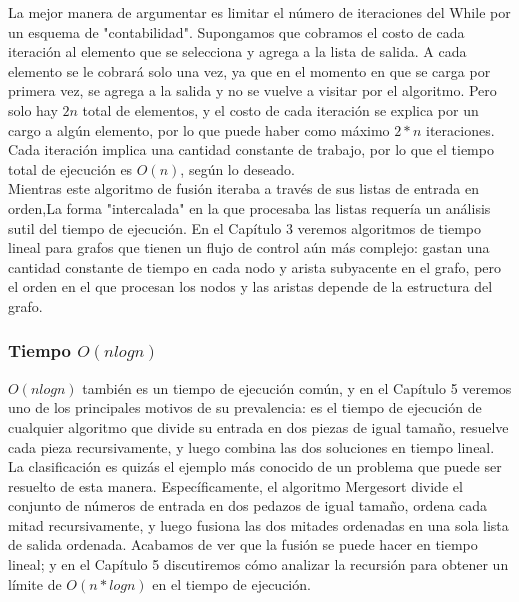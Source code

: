 \documentclass[a4paper, 12pt]{book}
\theoremstyle{dotless}
\begin{document}
La mejor manera de argumentar es limitar el número de iteraciones del While por un esquema de "contabilidad". Supongamos que cobramos el costo de cada iteración al elemento que se selecciona y agrega a la lista de salida. A cada elemento se le cobrará solo una vez, ya que en el momento en que se carga por primera vez, se agrega a la salida y no se vuelve a visitar por el algoritmo. Pero solo hay $2n$ total de elementos, y el costo de cada iteración se explica por un cargo a algún elemento, por lo que puede haber como máximo $2*n$ iteraciones. Cada iteración implica una cantidad constante de trabajo, por lo que el tiempo total de ejecución es $O(n)$, según lo deseado.\\

 Mientras este algoritmo de fusión iteraba a través de sus listas de entrada en orden,La forma "intercalada" en la que procesaba las listas requería un análisis  sutil del tiempo de ejecución. En el Capítulo 3 veremos algoritmos de tiempo lineal para grafos que tienen un flujo de control aún más complejo: gastan una cantidad constante de tiempo en cada nodo y arista subyacente en el grafo, pero el orden en el que procesan los nodos y las aristas depende de la estructura del grafo.\\

\subsubsection*{Tiempo $O(nlogn)$} 

$O(nlog n)$ también es un tiempo de ejecución común, y en el Capítulo 5 veremos uno de los principales motivos de su prevalencia: es el tiempo de ejecución de cualquier algoritmo que divide su entrada en dos piezas de igual tamaño, resuelve cada pieza recursivamente, y luego combina las dos soluciones en tiempo lineal.\\

La clasificación es quizás el ejemplo más conocido de un problema que puede ser resuelto de esta manera. Específicamente, el algoritmo Mergesort divide el conjunto de números de entrada en dos pedazos de igual tamaño, ordena cada mitad recursivamente, y luego fusiona las dos mitades ordenadas en una sola lista de salida ordenada. Acabamos de ver que la fusión se puede hacer en tiempo lineal; y en el Capítulo 5 discutiremos cómo analizar la recursión para obtener un límite de $O(n*log n)$ en el tiempo de ejecución.\\
\end{document}
